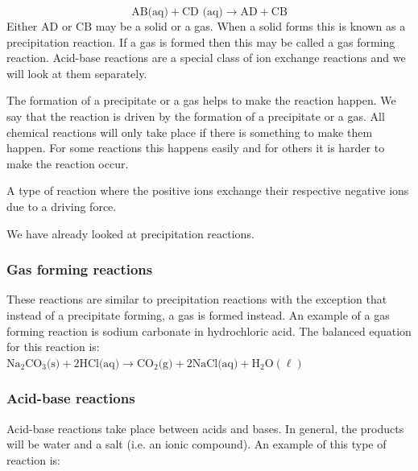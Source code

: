 {{    \begin{equation*}
    \text{AB(aq)}+\text{CD (aq)}\to \text{AD}+\text{CB}
      \end{equation*}
	  Either $\text{AD}$ or $\text{CB}$ may be a solid or a gas. When a solid forms this is known as a precipitation reaction. If a gas is formed then this may be called a gas forming reaction. Acid-base reactions are a special class of ion exchange reactions and we will look at them separately. 
      \par 
      \label{m38719*eip-179}The formation of a precipitate or a gas helps to make the reaction happen. We say that the reaction is driven by the formation of a precipitate or a gas. All chemical reactions will only take place if there is something to make them happen. For some reactions this happens easily and for others it is harder to make the reaction occur.  \par 
\label{m38719*id7583}
  { \label{m38719*eip-id1168354893169}A type of reaction where the positive ions exchange their respective negative ions due to a driving force. } 
\label{m38719*uid10825}
	\par
We have already looked at precipitation reactions.
\subsubsection*{Gas forming reactions}
These reactions are similar to precipitation reactions with the exception that instead of a precipitate forming, a gas is formed instead. An example of a gas forming reaction is sodium carbonate in hydrochloric acid. The balanced equation for this reaction is: \\
$\text{Na}_{2}\text{CO}_{3} \text{(s)} + 2\text{HCl} \text{(aq)} \to \text{CO}_{2} \text{(g)} + 2\text{NaCl} \text{(aq)} + \text{H}_{2}\text{O} (\ell)$ 
            \subsubsection*{Acid-base reactions}
            \nopagebreak
\label{m38719*id0821354}Acid-base reactions take place between acids and bases. In general, the products will be water and a salt (i.e. an ionic compound). An example of this type of reaction is: \label{m38719*eid1534}\nopagebreak\noindent{}
	    
}}
